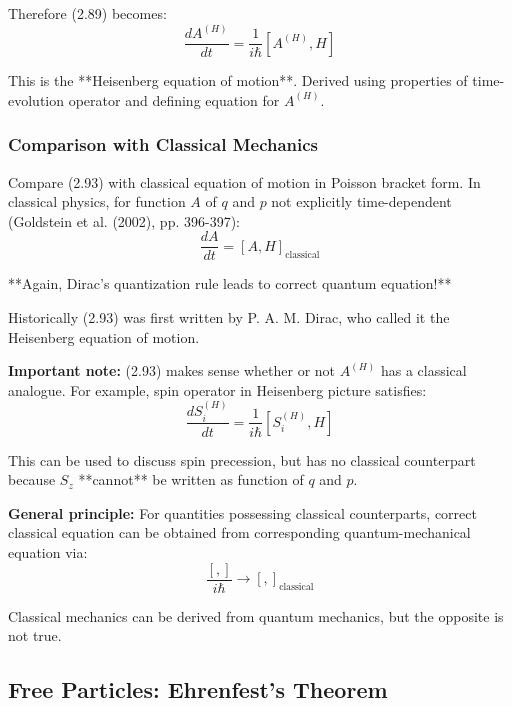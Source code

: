 \documentclass[11pt,a4paper]{article}
\begin{document}
Therefore (2.89) becomes:
\begin{equation}
\boxed{\frac{dA^{(H)}}{dt} = \frac{1}{i\hbar}[A^{(H)}, H]}
\tag{2.93}
\end{equation}

This is the **Heisenberg equation of motion**. Derived using properties of time-evolution operator and defining equation for $A^{(H)}$.

\subsubsection{Comparison with Classical Mechanics}

Compare (2.93) with classical equation of motion in Poisson bracket form. In classical physics, for function $A$ of $q$ and $p$ not explicitly time-dependent (Goldstein et al. (2002), pp. 396-397):
\begin{equation}
\frac{dA}{dt} = [A, H]_{\text{classical}}
\tag{2.94}
\end{equation}

**Again, Dirac's quantization rule leads to correct quantum equation!**

Historically (2.93) was first written by P. A. M. Dirac, who called it the Heisenberg equation of motion.

\textbf{Important note:} (2.93) makes sense whether or not $A^{(H)}$ has a classical analogue. For example, spin operator in Heisenberg picture satisfies:
\begin{equation}
\frac{dS_i^{(H)}}{dt} = \frac{1}{i\hbar}[S_i^{(H)}, H]
\tag{2.95}
\end{equation}

This can be used to discuss spin precession, but has no classical counterpart because $S_z$ **cannot** be written as function of $q$ and $p$.

\textbf{General principle:} For quantities possessing classical counterparts, correct classical equation can be obtained from corresponding quantum-mechanical equation via:
\begin{equation}
\frac{[,]}{i\hbar} \to [,]_{\text{classical}}
\tag{2.96}
\end{equation}

Classical mechanics can be derived from quantum mechanics, but the opposite is not true.

\subsection{Free Particles: Ehrenfest's Theorem}
\end{document}
